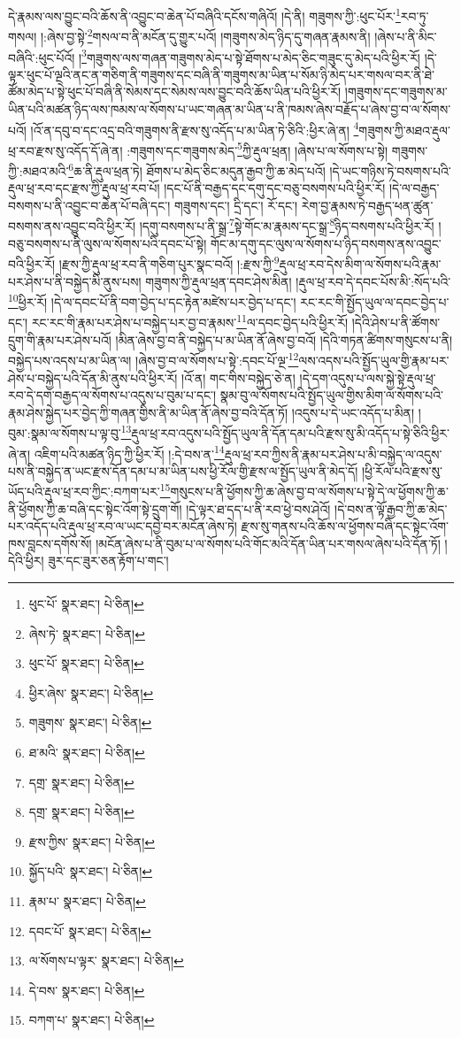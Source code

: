 དེ་རྣམས་ལས་བྱུང་བའི་ཆོས་ནི་འབྱུང་བ་ཆེན་པོ་བཞིའི་དངོས་གཞིའོ། །དེ་ནི། གཟུགས་ཀྱི་:ཕུང་པོར་\footnote{ཕུང་པོ་  སྣར་ཐང་།  པེ་ཅིན། }རབ་ཏུ་གསལ། །:ཞེས་བྱ་སྟེ་\footnote{ཞེས་ཏེ་  སྣར་ཐང་།  པེ་ཅིན། }གསལ་བ་ནི་མངོན་དུ་གྱུར་པའོ། །གཟུགས་མེད་ཉིད་དུ་གཞན་རྣམས་ནི། །ཞེས་པ་ནི་མིང་བཞིའི་:ཕུང་པོའོ། །\footnote{ཕུང་པོ་  སྣར་ཐང་།  པེ་ཅིན། }གཟུགས་ལས་གཞན་གཟུགས་མེད་པ་སྟེ་ཐོགས་པ་མེད་ཅིང་གཟུང་དུ་མེད་པའི་ཕྱིར་རོ། །དེ་ལྟར་ཕུང་པོ་ལྔའི་ནང་ན་གཅིག་ནི་གཟུགས་དང་བཞི་ནི་གཟུགས་མ་ཡིན་པ་སོམ་ཉི་མེད་པར་གསལ་བར་ནི་ཐེ་ཚོམ་མེད་པ་སྟེ་ཕུང་པོ་བཞི་ནི་སེམས་དང་སེམས་ལས་བྱུང་བའི་ཆོས་ཡིན་པའི་ཕྱིར་རོ། །གཟུགས་དང་གཟུགས་མ་ཡིན་པའི་མཚན་ཉིད་ལས་ཁམས་ལ་སོགས་པ་ཡང་གཞན་མ་ཡིན་པ་ནི་ཁམས་ཞེས་བརྗོད་པ་ཞེས་བྱ་བ་ལ་སོགས་པའོ། །འོ་ན་དབུ་བ་དང་འདྲ་བའི་གཟུགས་ནི་རྫས་སུ་འདོད་པ་མ་ཡིན་ཏེ་ཅིའི་:ཕྱིར་ཞེ་ན། \footnote{ཕྱིར་ཞེས་  སྣར་ཐང་།  པེ་ཅིན། }གཟུགས་ཀྱི་མཐའ་རྡུལ་ཕྲ་རབ་རྫས་སུ་འདོད་དོ་ཞེ་ན། :གཟུགས་དང་གཟུགས་མེད་\footnote{གཟུགས་  སྣར་ཐང་།  པེ་ཅིན། }ཀྱི་རྡུལ་ཕྲན། །ཞེས་པ་ལ་སོགས་པ་སྟེ། གཟུགས་ཀྱི་:མཐའ་མའི་\footnote{ཐ་མའི་  སྣར་ཐང་།  པེ་ཅིན། }ཆ་ནི་རྡུལ་ཕྲན་ཏེ། ཐོགས་པ་མེད་ཅིང་མདུན་རྒྱབ་ཀྱི་ཆ་མེད་པའོ། །དེ་ཡང་གཉིས་ཏེ་བསགས་པའི་རྡུལ་ཕྲ་རབ་དང་རྫས་ཀྱི་རྡུལ་ཕྲ་རབ་པོ། །དང་པོ་ནི་བརྒྱད་དང་དགུ་དང་བཅུ་བསགས་པའི་ཕྱིར་རོ། །དེ་ལ་བརྒྱད་བསགས་པ་ནི་འབྱུང་བ་ཆེན་པོ་བཞི་དང་། གཟུགས་དང་། དྲི་དང་། རོ་དང་། རེག་བྱ་རྣམས་ཏེ་བརྒྱད་ཕན་ཚུན་བསགས་ནས་འབྱུང་བའི་ཕྱིར་རོ། །དགུ་བསགས་པ་ནི་སྒྲ་\footnote{དགྲ་  སྣར་ཐང་།  པེ་ཅིན། }སྟེ་གོང་མ་རྣམས་དང་སྒྲ་\footnote{དགྲ་  སྣར་ཐང་།  པེ་ཅིན། }ཉིད་བསགས་པའི་ཕྱིར་རོ། །བཅུ་བསགས་པ་ནི་ལུས་ལ་སོགས་པའི་དབང་པོ་སྟེ། གོང་མ་དགུ་དང་ལུས་ལ་སོགས་པ་ཉིད་བསགས་ནས་འབྱུང་བའི་ཕྱིར་རོ། །རྫས་ཀྱི་རྡུལ་ཕྲ་རབ་ནི་གཅིག་པུར་སྣང་བའོ། །:རྫས་ཀྱི་\footnote{རྫས་ཀྱིས་  སྣར་ཐང་།  པེ་ཅིན། }རྡུལ་ཕྲ་རབ་དེས་མིག་ལ་སོགས་པའི་རྣམ་པར་ཤེས་པ་ནི་བསྐྱེད་མི་ནུས་པས། གཟུགས་ཀྱི་རྡུལ་ཕྲན་དབང་ཤེས་མིན། །རྡུལ་ཕྲ་རབ་དེ་དབང་པོས་མི་:སོད་པའི་\footnote{སྐྱོད་པའི་  སྣར་ཐང་།  པེ་ཅིན། }ཕྱིར་རོ། །དེ་ལ་དབང་པོ་ནི་བག་བྱེད་པ་དང་རྟེན་མཛེས་པར་བྱེད་པ་དང་། རང་རང་གི་སྤྱོད་ཡུལ་ལ་དབང་བྱེད་པ་དང་། རང་རང་གི་རྣམ་པར་ཤེས་པ་བསྐྱེད་པར་བྱ་བ་རྣམས་\footnote{རྣམ་པ་  སྣར་ཐང་།  པེ་ཅིན། }ལ་དབང་བྱེད་པའི་ཕྱིར་རོ། །དེའི་ཤེས་པ་ནི་ཚོགས་དྲུག་གི་རྣམ་པར་ཤེས་པའོ། །མིན་ཞེས་བྱ་བ་ནི་བསྐྱེད་པ་མ་ཡིན་ནོ་ཞེས་བྱ་བའོ། །དེའི་གཏན་ཚིགས་གསུངས་པ་ནི། བསྐྱེད་པས་འདས་པ་མ་ཡིན་ལ། །ཞེས་བྱ་བ་ལ་སོགས་པ་སྟེ་:དབང་པོ་ལྔ་\footnote{དབང་པོ་  སྣར་ཐང་།  པེ་ཅིན། }ལས་འདས་པའི་སྤྱོད་ཡུལ་གྱི་རྣམ་པར་ཤེས་པ་བསྐྱེད་པའི་དོན་མི་ནུས་པའི་ཕྱིར་རོ། །འོ་ན། གང་གིས་བསྐྱེད་ཅེ་ན། །དེ་དག་འདུས་པ་ལས་སྐྱེ་སྟེ་རྡུལ་ཕྲ་རབ་དེ་དག་བརྒྱད་ལ་སོགས་པ་འདུས་པ་བུམ་པ་དང་། སྣམ་བུ་ལ་སོགས་པའི་སྤྱོད་ཡུལ་གྱིས་མིག་ལ་སོགས་པའི་རྣམ་ཤེས་སྐྱེད་པར་བྱེད་ཀྱི་གཞན་གྱིས་ནི་མ་ཡིན་ནོ་ཞེས་བྱ་བའི་དོན་ཏོ། །འདུས་པ་དེ་ཡང་འདོད་པ་མིན། །བུམ་:སྣམ་ལ་སོགས་པ་ལྟ་བུ་\footnote{ལ་སོགས་པ་ལྟར་  སྣར་ཐང་།  པེ་ཅིན། }རྡུལ་ཕྲ་རབ་འདུས་པའི་སྤྱོད་ཡུལ་ནི་དོན་དམ་པའི་རྫས་སུ་མི་འདོད་པ་སྟེ་ཅིའི་ཕྱིར་ཞེ་ན། འཇིག་པའི་མཚན་ཉིད་ཀྱི་ཕྱིར་རོ། །:དེ་བས་ན་\footnote{དེ་བས་  སྣར་ཐང་།  པེ་ཅིན། }རྡུལ་ཕྲ་རབ་ཀྱིས་ནི་རྣམ་པར་ཤེས་པ་མི་བསྐྱེད་ལ་འདུས་པས་ནི་བསྐྱེད་ན་ཡང་རྫས་དོན་དམ་པ་མ་ཡིན་པས་ཕྱི་རོལ་གྱི་རྫས་ལ་སྤྱོད་ཡུལ་ནི་མེད་དོ། །ཕྱི་རོལ་པའི་རྫས་སུ་ཡོད་པའི་རྡུལ་ཕྲ་རབ་ཀྱིང་:བཀག་པར་\footnote{བཀག་པ་  སྣར་ཐང་།  པེ་ཅིན། }གསུངས་པ་ནི་ཕྱོགས་ཀྱི་ཆ་ཞེས་བྱ་བ་ལ་སོགས་པ་སྟེ་དེ་ལ་ཕྱོགས་ཀྱི་ཆ་ནི་ཕྱོགས་ཀྱི་ཆ་བཞི་དང་སྟེང་འོག་སྟེ་དྲུག་གོ། །དེ་ལྟར་ཐ་དད་པ་ནི་རབ་ཕྱེ་བས་ཤེའོ། །དེ་བས་ན་ལྟོ་རྒྱབ་ཀྱི་ཆ་མེད་པར་འདོད་པའི་རྡུལ་ཕྲ་རབ་ལ་ཡང་དབྱེ་བར་མངོན་ཞེས་ཏེ། རྫས་སུ་གནས་པའི་ཆོས་ལ་ཕྱོགས་བཞི་དང་སྟེང་འོག་ཁས་བླངས་དགོས་སོ། །མངོན་ཞེས་པ་ནི་བུམ་པ་ལ་སོགས་པའི་གོང་མའི་དོན་ཡིན་པར་གསལ་ཞེས་པའི་དོན་ཏོ། །དེའི་ཕྱིར། ཟུར་དང་ཟུར་ཅན་རྟོག་པ་གང་། 